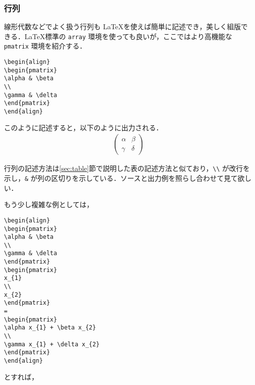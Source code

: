\subsubsection{行列}

線形代数などでよく扱う行列も \LaTeX を使えば簡単に記述でき，美しく組版できる．\LaTeX 標準の \verb|array| 環境を使っても良いが，ここではより高機能な \verb|pmatrix| 環境を紹介する．

\begin{screen}
\begin{verbatim}
\begin{align}
\begin{pmatrix}
\alpha & \beta
\\
\gamma & \delta
\end{pmatrix}
\end{align}
\end{verbatim}
\end{screen}
このように記述すると，以下のように出力される．
%
\begin{align}
\begin{pmatrix}
\alpha & \beta
\\
\gamma & \delta
\end{pmatrix}
\end{align}

行列の記述方法は\ref{sec:table}節で説明した表の記述方法と似ており，\verb|\\| が改行を示し，\verb|&| が列の区切りを示している．ソースと出力例を照らし合わせて見て欲しい．

もう少し複雑な例としては，

\begin{screen}
\begin{verbatim}
\begin{align}
\begin{pmatrix}
\alpha & \beta
\\
\gamma & \delta
\end{pmatrix}
\begin{pmatrix}
x_{1}
\\
x_{2}
\end{pmatrix}
=
\begin{pmatrix}
\alpha x_{1} + \beta x_{2}
\\
\gamma x_{1} + \delta x_{2}
\end{pmatrix}
\end{align}
\end{verbatim}
\end{screen}

とすれば，

